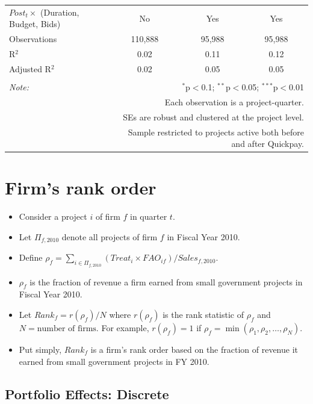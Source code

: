 \documentclass[
]{article}
\providecommand{\tightlist}{%
  \setlength{\itemsep}{0pt}\setlength{\parskip}{0pt}}
\begin{document}
\begin{table}[H]
\begin{tabular}{@{\extracolsep{-2pt}}lccc}
$Post_t \times$  (Duration, Budget, Bids) & No & Yes & Yes \\ 
Observations & 110,888 & 95,988 & 95,988 \\ 
R$^{2}$ & 0.02 & 0.11 & 0.12 \\ 
Adjusted R$^{2}$ & 0.02 & 0.05 & 0.05 \\ 
\hline 
\hline \\[-1.8ex] 
\textit{Note:}  & \multicolumn{3}{r}{$^{*}$p$<$0.1; $^{**}$p$<$0.05; $^{***}$p$<$0.01} \\ 
 & \multicolumn{3}{r}{Each observation is a project-quarter.} \\ 
 & \multicolumn{3}{r}{SEs are robust and clustered at the project level.} \\ 
 & \multicolumn{3}{r}{Sample restricted to projects active both before and after Quickpay.} \\ 
\end{tabular} 
\end{table}

\hypertarget{firms-rank-order}{%
\section{Firm's rank order}\label{firms-rank-order}}

\begin{itemize}
\tightlist
\item
  Consider a project \(i\) of firm \(f\) in quarter \(t\).
\item
  Let \(\Pi_{f,2010}\) denote all projects of firm \(f\) in Fiscal Year
  2010.
\item
  Define
  \(\rho_f = \sum_{i \in \Pi_{f,2010}} (Treat_i \times FAO_{if})/Sales_{f,\text{2010}}\).
\item
  \(\rho_f\) is the fraction of revenue a firm earned from small
  government projects in Fiscal Year 2010.
\item
  Let \(Rank_f = r(\rho_f)/N\) where \(r(\rho_f)\) is the rank statistic
  of \(\rho_{f}\) and \(N = \text{number of firms}.\) For example,
  \(r(\rho_f)=1\) if \(\rho_f=\min(\rho_1,\rho_2,\ldots,\rho_N)\).
\item
  Put simply, \(Rank_f\) is a firm's rank order based on the fraction of
  revenue it earned from small government projects in FY 2010.
\end{itemize}

\hypertarget{portfolio-effects-discrete}{%
\subsection{Portfolio Effects:
Discrete}\label{portfolio-effects-discrete}}
\end{document}
